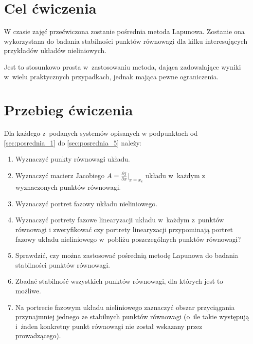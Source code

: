 \documentclass{sprawozdanie-agh}
\begin{document}

\stronatytulowa{}

\section{Cel ćwiczenia}
W czasie zajęć przećwiczona zostanie pośrednia metoda Lapunowa.
Zostanie ona wykorzystana do badania stabilności punktów równowagi dla kilku
interesujących przykładów układów nieliniowych.

Jest to stosunkowo prosta w~zastosowaniu metoda, dająca zadowalające wyniki
w~wielu praktycznych przypadkach, jednak mająca pewne ograniczenia.


\section{Przebieg ćwiczenia}
    Dla każdego z~podanych systemów opisanych w podpunktach od \ref{sec:posrednia_1} do \ref{sec:posrednia_5} należy:
    \begin{enumerate}[label=\textbf{Krok \arabic*}]
        \item Wyznaczyć punkty równowagi układu.
        \item Wyznaczyć macierz Jacobiego $A = \frac{\partial f}{\partial x}\bigg|_{x=x_e}$ układu w~każdym z wyznaczonych punktów równowagi.
        \item Wyznaczyć portret fazowy układu nieliniowego.
        \item Wyznaczyć portrety fazowe linearyzacji układu w~każdym z~punktów równowagi i zweryfikować czy portrety linearyzacji przypominają portret fazowy układu nieliniowego w~pobliżu poszczególnych punktów równowagi?
        \item Sprawdzić, czy można zastosować pośrednią metodę Lapunowa do badania stabilności punktów równowagi.
        \item Zbadać stabilność wszystkich punktów równowagi, dla których jest to możliwe.
        \item Na portrecie fazowym układu nieliniowego zaznaczyć obszar
        przyciągania przynajmniej jednego ze stabilnych punktów równowagi (o~ile
        takie występują i~żaden konkretny punkt równowagi nie został wskazany przez prowadzącego).
    \end{enumerate}
\end{document}
